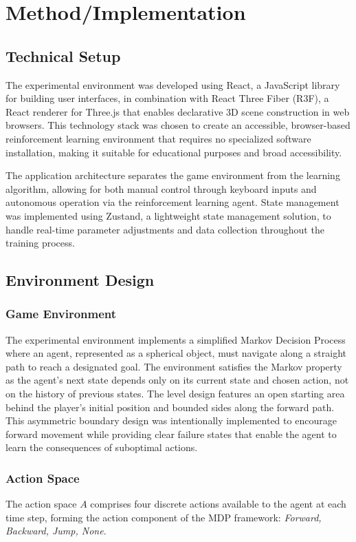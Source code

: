 \section{Method/Implementation}

\subsection{Technical Setup}

The experimental environment was developed using React, a JavaScript library for building user interfaces, in combination with React Three Fiber (R3F), a React renderer for Three.js that enables declarative 3D scene construction in web browsers. This technology stack was chosen to create an accessible, browser-based reinforcement learning environment that requires no specialized software installation, making it suitable for educational purposes and broad accessibility.

The application architecture separates the game environment from the learning algorithm, allowing for both manual control through keyboard inputs and autonomous operation via the reinforcement learning agent. State management was implemented using Zustand, a lightweight state management solution, to handle real-time parameter adjustments and data collection throughout the training process.

\subsection{Environment Design}

\subsubsection{Game Environment}
The experimental environment implements a simplified Markov Decision Process where an agent, represented as a spherical object, must navigate along a straight path to reach a designated goal. The environment satisfies the Markov property as the agent's next state depends only on its current state and chosen action, not on the history of previous states. The level design features an open starting area behind the player's initial position and bounded sides along the forward path. This asymmetric boundary design was intentionally implemented to encourage forward movement while providing clear failure states that enable the agent to learn the consequences of suboptimal actions.

\subsubsection{Action Space}
The action space $A$ comprises four discrete actions available to the agent at each time step, forming the action component of the MDP framework: \textit{Forward, Backward, Jump, None}.

